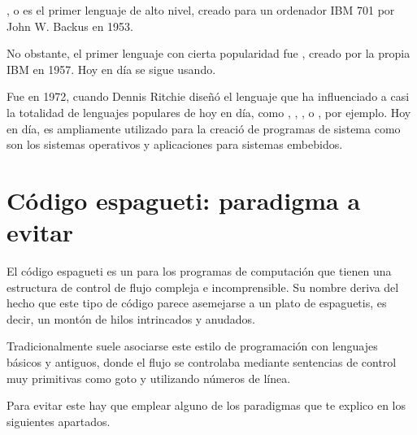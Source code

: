 \documentclass[letterpaper,10pt,spanish]{sphinxmanual}
\begin{document}
\nopagebreak


\sphinxAtStartPar
{},  o  es el primer lenguaje de alto nivel, creado para un ordenador IBM 701 por John W. Backus en 1953.

\sphinxAtStartPar
No obstante, el primer lenguaje con cierta popularidad fue , creado por la propia IBM en 1957. Hoy en día se sigue usando.

\sphinxAtStartPar
Fue en 1972, cuando Dennis Ritchie  diseñó el lenguaje  que ha influenciado a casi la totalidad de lenguajes populares de hoy en día, como , , ,  o , por ejemplo. Hoy en día,  es ampliamente utilizado para la creació de programas de sistema como son los sistemas operativos y aplicaciones para sistemas embebidos.




\section{Código espagueti: paradigma a evitar}
\label{\detokenize{lenguajes_alto_nivel_clasificacion:codigo-espagueti-paradigma-a-evitar}}
\sphinxAtStartPar
El código espagueti es un  para los programas de computación que tienen una estructura de control de flujo compleja e incomprensible. Su nombre deriva del hecho que este tipo de código parece asemejarse a un plato de espaguetis, es decir, un montón de hilos intrincados y anudados.

\sphinxAtStartPar
Tradicionalmente suele asociarse este estilo de programación con lenguajes básicos y antiguos, donde el flujo se controlaba mediante sentencias de control muy primitivas como goto y utilizando números de línea.

\sphinxAtStartPar
Para evitar este  hay que emplear alguno de los paradigmas que te explico en los siguientes apartados.
\end{document}
